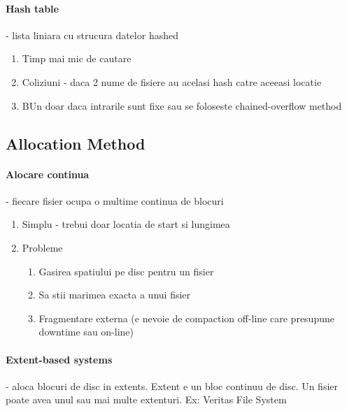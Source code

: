 \documentclass{article}
\begin{document}
\paragraph*{Hash table} - lista liniara cu strucura datelor hashed
\begin{enumerate}
    \item Timp mai mic de cautare
    \item Coliziuni - daca 2 nume de fisiere au acelasi hash catre aceeasi locatie
    \item BUn doar daca intrarile sunt fixe sau se foloseste chained-overflow method
\end{enumerate}

\subsection*{Allocation Method}
\paragraph*{Alocare continua} - fiecare fisier ocupa o multime continua de blocuri
\begin{enumerate}
    \item Simplu - trebui doar locatia de start si lungimea
    \item Probleme
          \begin{enumerate}
              \item Gasirea spatiului pe disc pentru un fisier
              \item Sa stii marimea exacta a unui fisier
              \item Fragmentare externa (e nevoie de compaction off-line care presupune downtime sau on-line)
          \end{enumerate}
\end{enumerate}

\paragraph*{Extent-based systems} - aloca blocuri de disc in extents. Extent e un bloc continuu de disc. Un fisier poate avea unul sau mai multe extenturi. Ex: Veritas File System
\end{document}
